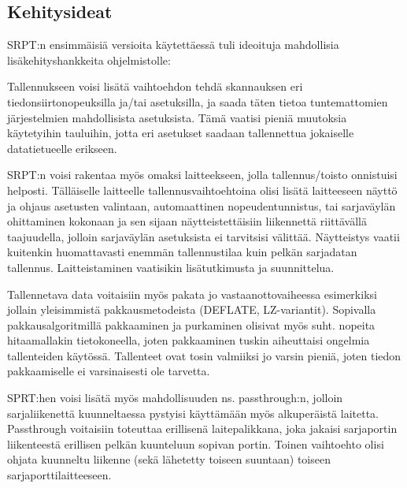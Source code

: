 \subsection{Kehitysideat}

SRPT:n ensimmäisiä versioita käytettäessä tuli ideoituja mahdollisia lisäkehityshankkeita ohjelmistolle:

Tallennukseen voisi lisätä vaihtoehdon tehdä skannauksen eri tiedonsiirtonopeuksilla ja/tai asetuksilla, ja saada täten tietoa tuntemattomien järjestelmien mahdollisista asetuksista. Tämä vaatisi pieniä muutoksia käytetyihin tauluihin, jotta eri asetukset saadaan tallennettua jokaiselle datatietueelle erikseen.

SRPT:n voisi rakentaa myös omaksi laitteekseen, jolla tallennus/toisto onnistuisi helposti. Tälläiselle laitteelle tallennusvaihtoehtoina olisi lisätä laitteeseen näyttö ja ohjaus asetusten valintaan, automaattinen nopeudentunnistus, tai sarjaväylän ohittaminen kokonaan ja sen sijaan näytteistettäisiin liikennettä riittävällä taajuudella, jolloin sarjaväylän asetuksista ei tarvitsisi välittää. Näytteistys vaatii kuitenkin huomattavasti enemmän tallennustilaa kuin pelkän sarjadatan tallennus. Laitteistaminen vaatisikin lisätutkimusta ja suunnittelua.

Tallennetava data voitaisiin myös pakata jo vastaanottovaiheessa esimerkiksi jollain yleisimmistä pakkausmetodeista (DEFLATE, LZ-variantit). Sopivalla pakkausalgoritmillä pakkaaminen ja purkaminen olisivat myös suht. nopeita hitaamallakin tietokoneella, joten pakkaaminen tuskin aiheuttaisi ongelmia tallenteiden käytössä. Tallenteet ovat tosin valmiiksi jo varsin pieniä, joten tiedon pakkaamiselle ei varsinaisesti ole tarvetta.

SPRT:hen voisi lisätä myös mahdollisuuden ns. passthrough:n, jolloin sarjaliikenettä kuunneltaessa pystyisi käyttämään myös alkuperäistä laitetta. Passthrough voitaisiin toteuttaa erillisenä laitepalikkana, joka jakaisi sarjaportin liikenteestä erillisen pelkän kuunteluun sopivan portin. Toinen vaihtoehto olisi ohjata kuunneltu liikenne (sekä lähetetty toiseen suuntaan) toiseen sarjaporttilaitteeseen.

\newpage

%


